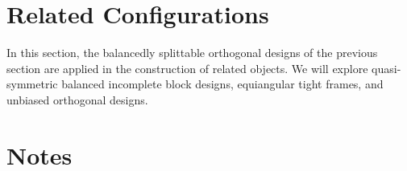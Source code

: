 \documentclass[../../main]{subfiles}
\begin{document}
 \section{\centering Related Configurations}
 In this section, the balancedly splittable orthogonal designs of the previous
 section are applied in the construction of related objects. We will explore
 quasi-symmetric balanced incomplete block designs, equiangular tight frames,
 and unbiased orthogonal designs. 
 
 \dinkus
 
 
 
 \singlespace
 
 \fancyhf{}

 \fancyhead[RO,LE]{\thepage}

 \section*{\centering Notes}
 \thednotes
 
 \doublespacing
 
 \biblio
\end{document}
